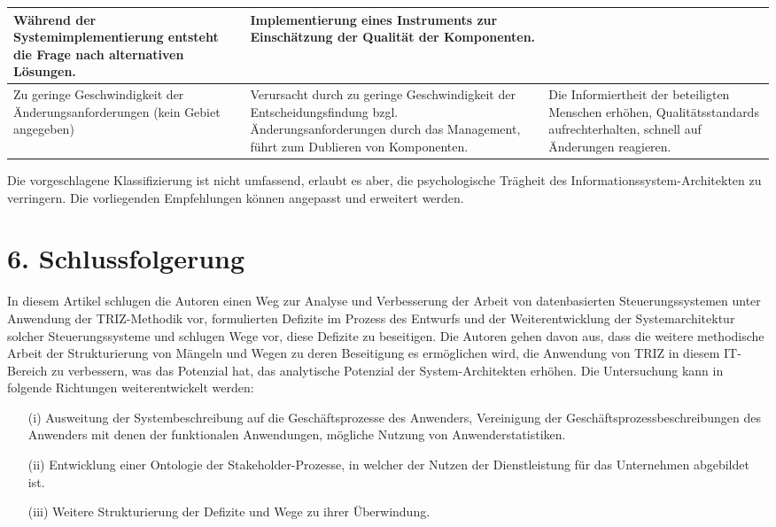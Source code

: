\documentclass[11pt,a4paper]{article}
\begin{document}
\begin{center}
\begin{tabular}{|p{}|p{}|p{}|}
    Während der Systemimplementierung entsteht die Frage nach alternativen
    Lösungen. &

    Implementierung eines Instruments zur Einschätzung der Qualität der
    Komponenten. \\\hline

    Zu geringe Geschwindigkeit der Änderungsanforderungen (kein Gebiet
    angegeben) &
    
    Verursacht durch zu geringe Geschwindigkeit der Entscheidungsfindung
    bzgl. Änderungsanforderungen durch das Management, führt zum Dublieren von
    Komponenten. & 
    
    Die Informiertheit der beteiligten Menschen erhöhen, Qualitätsstandards
    aufrechterhalten, schnell auf Änderungen reagieren.\\\hline
  \end{tabular}
\end{center}

Die vorgeschlagene Klassifizierung ist nicht umfassend, erlaubt es aber, die
psychologische Trägheit des Informationssystem-Architekten zu verringern. Die
vorliegenden Empfehlungen können angepasst und erweitert werden.

\section*{6. Schlussfolgerung}
In diesem Artikel schlugen die Autoren einen Weg zur Analyse und Verbesserung
der Arbeit von datenbasierten Steuerungssystemen unter Anwendung der
TRIZ-Methodik vor, formulierten Defizite im Prozess des Entwurfs und der
Weiterentwicklung der Systemarchitektur solcher Steuerungssysteme und schlugen
Wege vor, diese Defizite zu beseitigen. Die Autoren gehen davon aus, dass die
weitere methodische Arbeit der Strukturierung von Mängeln und Wegen zu deren
Beseitigung es ermöglichen wird, die Anwendung von TRIZ in diesem IT-Bereich
zu verbessern, was das Potenzial hat, das analytische Potenzial der
System-Architekten erhöhen. Die Untersuchung kann in folgende Richtungen
weiterentwickelt werden: 
\begin{itemize}
\item[(i)] Ausweitung der Systembeschreibung auf die Geschäftsprozesse des
  Anwenders, Vereinigung der Geschäftsprozessbeschreibungen des Anwenders mit
  denen der funktionalen Anwendungen, mögliche Nutzung von
  Anwenderstatistiken.
\item[(ii)] Entwicklung einer Ontologie der Stakeholder-Prozesse, in welcher
  der Nutzen der Dienstleistung für das Unternehmen abgebildet ist.
\item[(iii)] Weitere Strukturierung der Defizite und Wege zu ihrer
  Überwindung.
\end{itemize}
\end{document}
